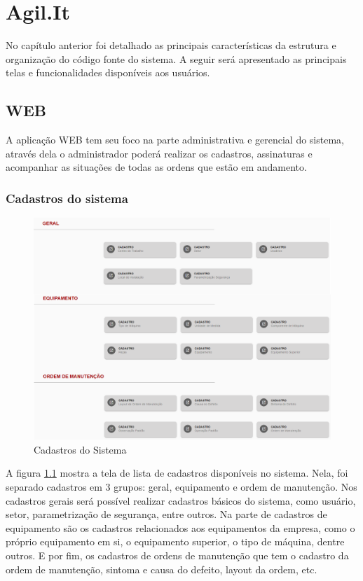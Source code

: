 \chapter{Agil.It}

No capítulo anterior foi detalhado as principais características da estrutura e organização do código fonte do sistema.
A seguir será apresentado as principais telas e funcionalidades disponíveis aos usuários.

\section{WEB}
A aplicação WEB tem seu foco na parte administrativa e gerencial do sistema, através dela o administrador poderá realizar os cadastros, assinaturas e acompanhar as situações de todas as ordens que estão em andamento.
\subsection{Cadastros do sistema}

\begin{figure}[H]
	\caption{\label{web-cadastros}Cadastros do Sistema}
	\begin{center}
		\includegraphics[scale=0.40]{./Figuras/agil.it/web-cadastros.png}
	\end{center}
\end{figure}

A figura \ref{web-cadastros} mostra a tela de lista de cadastros disponíveis no sistema.
Nela, foi separado cadastros em 3 grupos: geral, equipamento e ordem de manutenção.
Nos cadastros gerais será possível realizar cadastros básicos do sistema, como usuário, setor, parametrização de segurança, entre outros.
Na parte de cadastros de equipamento são os cadastros relacionados aos equipamentos da empresa, como o próprio equipamento em si, o equipamento superior, o tipo de máquina, dentre outros.
E por fim, os cadastros de ordens de manutenção que tem o cadastro da ordem de manutenção, sintoma e causa do defeito, layout da ordem, etc.

